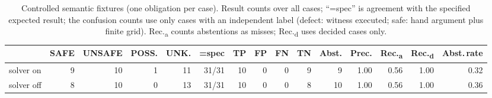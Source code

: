 \begin{table}[t]
\centering
\small

\caption{Controlled semantic fixtures (one obligation per case). Result counts over all cases; ``=spec'' is agreement with the specified expected result; the confusion counts use only cases with an independent label (defect: witness executed; safe: hand argument plus finite grid). Rec.\textsubscript{a} counts abstentions as misses; Rec.\textsubscript{d} uses decided cases only.}
\label{tab:semantic}
\begin{tabular}{lrrrrrrrrrrrrrr}
\toprule
 & SAFE & UNSAFE & POSS. & UNK. & =spec & TP & FP & FN & TN & Abst. & Prec. & Rec.\textsubscript{a} & Rec.\textsubscript{d} & Abst.\,rate \\
\midrule
solver on & 9 & 10 & 1 & 11 & 31/31 & 10 & 0 & 0 & 9 & 9 & 1.00 & 0.56 & 1.00 & 0.32 \\
solver off & 8 & 10 & 0 & 13 & 31/31 & 10 & 0 & 0 & 8 & 10 & 1.00 & 0.56 & 1.00 & 0.36 \\
\bottomrule
\end{tabular}
\end{table}
